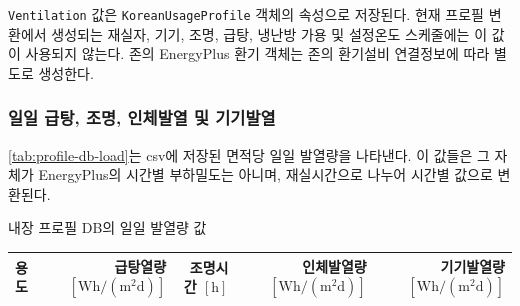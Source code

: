 \texttt{Ventilation} 값은
\texttt{KoreanUsageProfile} 객체의 속성으로 저장된다. 현재 프로필 변환에서 생성되는 재실자, 기기, 조명, 급탕, 냉난방 가용 및 설정온도 스케줄에는 이 값이 사용되지 않는다. 존의 EnergyPlus 환기 객체는 존의 환기설비 연결정보에 따라 별도로 생성한다.

\subsubsection{일일 급탕, 조명, 인체발열 및 기기발열}

\cref{tab:profile-db-load}는 csv에 저장된 면적당 일일 발열량을 나타낸다. 이 값들은 그 자체가 EnergyPlus의 시간별 부하밀도는 아니며, 재실시간으로 나누어 시간별 값으로 변환된다.

\begin{defaulttable}
  \caption{내장 프로필 DB의 일일 발열량 값}
  \label{tab:profile-db-load}
  {\small
  \renewcommand{\arraystretch}{1.08}
  \begin{tabularx}{\textwidth}{Xrrrr}
    \toprule
    용도 & \makecell[r]{급탕열량 \\ $[\mathrm{Wh/(m^2d)}]$} & \makecell[r]{조명시간\\$[\mathrm{h}]$} & \makecell[r]{인체발열량\\ $[\mathrm{Wh/(m^2d)}]$} & \makecell[r]{기기발열량\\ $[\mathrm{Wh/(m^2d)}]$} \\ 
    \midrule


\end{tabularx}}
\end{defaulttable}
